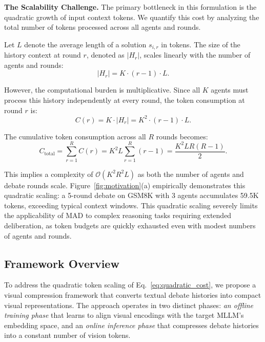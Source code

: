 \documentclass{article}
\theoremstyle{plain}
\theoremstyle{definition}
\theoremstyle{remark}
\begin{document}
\textbf{The Scalability Challenge.}
The primary bottleneck in this formulation is the quadratic growth of input 
context tokens. We quantify this cost by analyzing the total number of tokens 
processed across all agents and rounds.

Let $L$ denote the average length of a solution $s_{i,r}$ in tokens. The size 
of the history context at round $r$, denoted as $|H_r|$, scales linearly with 
the number of agents and rounds:
\begin{equation}
    |H_r| = K \cdot (r-1) \cdot L.
\end{equation}

However, the computational burden is multiplicative. Since all $K$ agents must 
process this history independently at every round, the token consumption at 
round $r$ is:
\begin{equation}
    C(r) = K \cdot |H_r| = K^2 \cdot (r-1) \cdot L.
\end{equation}

The cumulative token consumption across all $R$ rounds becomes:
\begin{equation}
\label{eq:quadratic_cost}
    C_{\text{total}} = \sum_{r=1}^{R} C(r) = K^2 L \sum_{r=1}^{R} (r-1) 
    = \frac{K^2 L R(R-1)}{2}.
\end{equation}

This implies a complexity of $\mathcal{O}(K^2 R^2 L)$ as both the number of 
agents and debate rounds scale. Figure~\ref{fig:motivation}(a) empirically 
demonstrates this quadratic scaling: a 5-round debate on GSM8K with 3 agents 
accumulates 59.5K tokens, exceeding typical context windows. This quadratic 
scaling severely limits the applicability of MAD to complex reasoning tasks 
requiring extended deliberation, as token budgets are quickly exhausted even 
with modest numbers of agents and rounds.















\subsection{Framework Overview}
\label{subsec:framework_overview}

To address the quadratic token scaling of Eq.~\ref{eq:quadratic_cost}, we propose 
a visual compression framework that converts textual debate histories into compact 
visual representations. The approach operates in two distinct phases: \textit{an offline 
training phase} that learns to align visual encodings with the target MLLM's 
embedding space, and an \textit{online inference phase} that compresses debate histories 
into a constant number of vision tokens.
\end{document}

